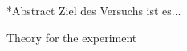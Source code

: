 \documentclass[pdftex, a4paper,11pt, twoside, UKenglish]{report}
\begin{document}
  
  
  
  
  
  
  
  
  \begin{chapter}*{Abstract}
    Ziel des Versuchs ist es...
    
    
  \end{chapter}
  
  \tableofcontents
  
  
  
  \begin{chapter}{Theory for the experiment}
    \label{chp:Theory}
    
    
    
  \end{chapter}
         
         
         
\end{document}
